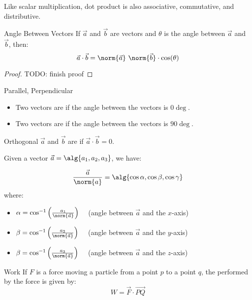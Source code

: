 \documentclass[12pt]{report}
\begin{document}
Like scalar multiplication, dot product is also associative, commutative, and distributive.

\begin{thmbox}{Angle Between Vectors}{}
    If $\vec{a}$ and $\vec{b}$ are vectors and $\theta$ is the angle between $\vec{a}$ and $\vec{b}$, then:
    \[ \vec{a} \cdot \vec{b} = \norm{\vec{a}} \ \norm{\vec{b}} \cdot \cos(\theta) \]
    \tcblower
    \begin{proof}
        TODO: finish proof
    \end{proof}
\end{thmbox}

\begin{dfnbox}{Parallel, Perpendicular}{}
    \begin{itemize}[noitemsep]
        \item Two vectors are  if the angle between the vectors is $0\deg$.
        \item Two vectors are  if the angle between the vectors is $90\deg$.
    \end{itemize}
\end{dfnbox}

\begin{dfnbox}{Orthogonal}{}
    $\vec{a}$ and $\vec{b}$ are  if $\vec{a} \cdot \vec{b} = 0$.
\end{dfnbox}

Given a vector $\vec{a} = \alg{a_1, a_2, a_3}$, we have:

\[ \frac{\vec{a}}{\norm{a}} = \alg{\cos \alpha, \cos \beta, \cos \gamma} \]
where:
\begin{itemize}
    \item $\alpha = \cos^{-1} \left( \frac{a_1}{\norm{\vec{a}}} \right) \quad$ (angle between $\vec{a}$ and the $x$-axis)
    \item $\beta = \cos^{-1} \left( \frac{a_2}{\norm{\vec{a}}} \right) \quad$ (angle between $\vec{a}$ and the $y$-axis)
    \item $\beta = \cos^{-1} \left( \frac{a_3}{\norm{\vec{a}}} \right) \quad$ (angle between $\vec{a}$ and the $z$-axis)
\end{itemize}

\begin{dfnbox}{Work}{}
    If $F$ is a force moving a particle from a point $p$ to a point $q$, the  performed by the force is given by:
    \[ W = \vec{F} \cdot \overrightarrow{PQ} \]
\end{dfnbox}
\end{document}
